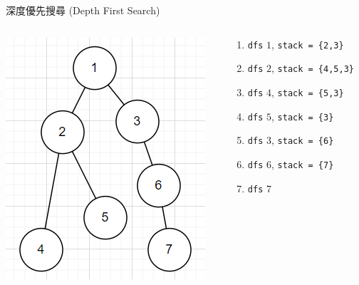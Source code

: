 \documentclass[aspectratio=169]{beamer}
\begin{document}
    \begin{frame}{深度優先搜尋 (Depth First Search)}
        \begin{columns}
            \begin{column}{0.5\textwidth}
                \begin{center}
                    \includegraphics[scale=0.5]{images/BFS.png}
                \end{center}
            \end{column}
            \begin{column}{0.5\textwidth}
                \begin{enumerate}
                    \item \texttt{dfs} $1$, \texttt{stack = \{2,3\}}
                    \item \texttt{dfs} $2$, \texttt{stack = \{4,5,3\}}
                    \item \texttt{dfs} $4$, \texttt{stack = \{5,3\}}
                    \item \texttt{dfs} $5$, \texttt{stack = \{3\}}
                    \item \texttt{dfs} $3$, \texttt{stack = \{6\}}
                    \item \texttt{dfs} $6$, \texttt{stack = \{7\}}
                    \item \texttt{dfs} $7$
                \end{enumerate}
            \end{column}
        \end{columns}
    \end{frame}
    
\end{document}
